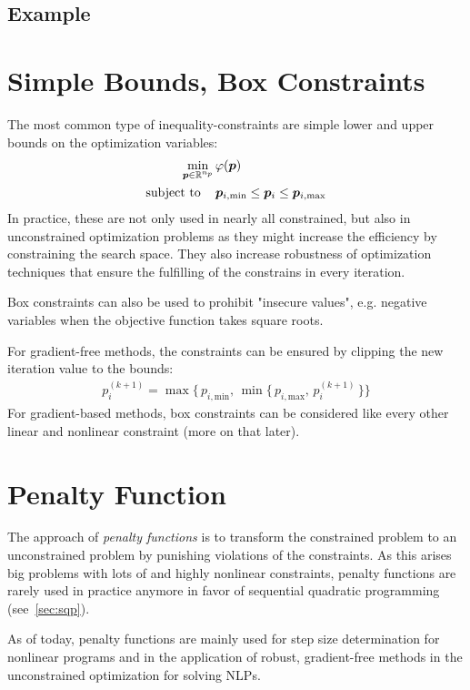 		\subsection{Example} %

	\section{Simple Bounds, Box Constraints}
		The most common type of inequality-constraints are simple lower and upper bounds on the optimization variables:
		\begin{align*}
			\min_{\bm{p} \in \mathbb{R}^{n_p}} & \, \varphi(\bm{p}) \\
			\mathrm{subject~to}\quad    & \,
			\bm{p}_{i, \mathrm{min}} \leq \bm{p}_i \leq \bm{p}_{i, \mathrm{max}}
		\end{align*}
		In practice, these are not only used in nearly all constrained, but also in unconstrained optimization problems as they might increase the efficiency by constraining the search space. They also increase robustness of optimization techniques that ensure the fulfilling of the constrains in every iteration.

		Box constraints can also be used to prohibit "insecure values", e.g. negative variables when the objective function takes square roots.

		For gradient-free methods, the constraints can be ensured by clipping the new iteration value to the bounds:
		\begin{align*}
			p_i^{(k + 1)} = \max\big\{\, p_{i, \mathrm{min}},\, \min\big\{\, p_{i, \mathrm{max}},\, p_i^{(k + 1)} \,\big\} \big\}
		\end{align*}
		For gradient-based methods, box constraints can be considered like every other linear and nonlinear constraint (more on that later).

	\section{Penalty Function}
		The approach of \emph{penalty functions} is to transform the constrained problem to an unconstrained problem by punishing violations of the constraints. As this arises big problems with lots of and highly nonlinear constraints, penalty functions are rarely used in practice anymore in favor of sequential quadratic programming (see~\autoref{sec:sqp}).

		As of today, penalty functions are mainly used for step size determination for nonlinear programs and in the application of robust, gradient-free methods in the unconstrained optimization for solving NLPs.

